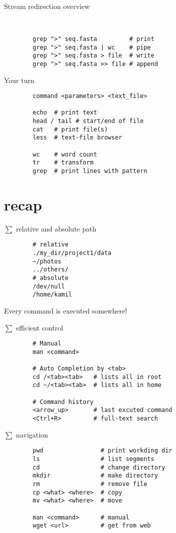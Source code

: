 \documentclass[xcolor=dvipsnames]{beamer}
\begin{document}
\begin{frame}[fragile]
	\huge
	Stream redirection overview
	\Large
	\begin{verbatim}


		grep ">" seq.fasta         # print
		grep ">" seq.fasta | wc    # pipe
		grep ">" seq.fasta > file  # write
		grep ">" seq.fasta >> file # append
	\end{verbatim}
\end{frame}

\begin{frame}[fragile]
	\huge
	Your turn
	\Large
	\begin{verbatim}
		command <parameters> <text_file>

		echo  # print text
		head / tail # start/end of file
		cat   # print file(s)
		less  # text-file browser

		wc    # word count
		tr    # transform
		grep  # print lines with pattern
	\end{verbatim}
\end{frame}

\section{recap}

\begin{frame}[fragile]
	$\sum$ relative and absolute path
	\Large
	\begin{verbatim}
		# relative
		./my_dir/project1/data
		~/photos
		../others/
		# absolute
		/dev/null
		/home/kamil
	\end{verbatim}
	Every command is executed somewhere!
\end{frame}

\begin{frame}[fragile]
	$\sum$ efficient control
	\Large
	\begin{verbatim}
		# Manual
		man <command>

		# Auto Completion by <tab>
		cd /<tab><tab>   # lists all in root
		cd ~/<tab><tab>  # lists all in home

		# Command history
		<arrow_up>       # last excuted command
		<Ctrl+R>         # full-text search
	\end{verbatim}
\end{frame}

\begin{frame}[fragile]
	$\sum$ navigation
	\Large
	\begin{verbatim}
		pwd                # print workding dir
		ls                 # list segments
		cd                 # change directory
		mkdir              # make directory
		rm                 # remove file
		cp <what> <where>  # copy
		mv <what> <where>  # move

		man <command>      # manual
		wget <url>         # get from web
	\end{verbatim}
\end{frame}
\end{document}
